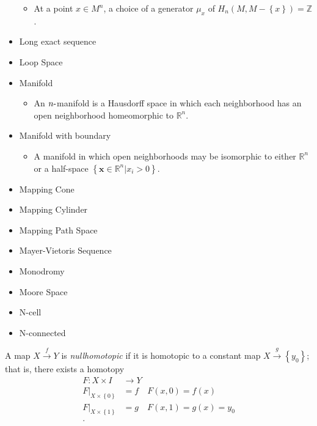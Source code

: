 \begin{itemize}
  \begin{itemize}
  \tightlist
  \item
    At a point \(x\in M^n\), a choice of a generator \(\mu_x\) of
    \(H_n(M, M - \left\{{x}\right\}) = {\mathbb{Z}}\).
  \end{itemize}
\item
  Long exact sequence
\item
  Loop Space
\item
  Manifold

  \begin{itemize}
  \tightlist
  \item
    An \(n{\hbox{-}}\)manifold is a Hausdorff space in which each
    neighborhood has an open neighborhood homeomorphic to
    \({\mathbb{R}}^n\).
  \end{itemize}
\item
  Manifold with boundary

  \begin{itemize}
  \tightlist
  \item
    A manifold in which open neighborhoods may be isomorphic to either
    \({\mathbb{R}}^n\) or a half-space
    \(\left\{{\mathbf{x} \in {\mathbb{R}}^n \mathrel{\Big|}x_i > 0}\right\}\).
  \end{itemize}
\item
  Mapping Cone
\item
  Mapping Cylinder
\item
  Mapping Path Space
\item
  Mayer-Vietoris Sequence
\item
  Monodromy
\item
  Moore Space
\item
  N-cell
\item
  N-connected
\end{itemize}

\begin{definition}[Nullhomotopic]

A map \(X\xrightarrow{f} Y\) is \emph{nullhomotopic} if it is homotopic
to a constant map \(X \xrightarrow{g} \left\{{y_0}\right\}\); that is,
there exists a homotopy
\begin{align*}  
F: X\times I &\to Y \\
 {\left.{{F}} \right|_{{X\times\left\{{0}\right\}}} }  &= f \quad F(x, 0) = f(x) \\
 {\left.{{F}} \right|_{{X\times\left\{{1}\right\}}} }  &= g  \quad F(x, 1) = g(x) = y_0\\
.\end{align*}

\end{definition}

